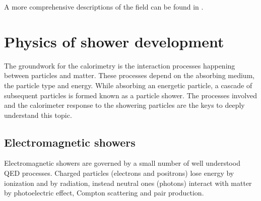 A more comprehensive descriptions of the field can be found in \cite{Wigmans_book, Wigmans_art_of_cal, Gianotti_article}.

\section{Physics of shower development}
The groundwork for the calorimetry is the interaction processes happening between particles and matter.
These processes depend on the absorbing medium, the particle type and energy.
While absorbing an energetic particle, a cascade of subsequent particles is formed known as a particle shower.
The processes involved and the calorimeter response to the showering particles are the keys to deeply understand this topic.\\

\subsection{Electromagnetic showers} \label{subsec:em_shower}
Electromagnetic showers are governed by a small number of well understood QED processes. Charged particles (electrons and positrons) lose energy by ionization and by radiation, instead neutral ones (photons) interact with matter by photoelectric effect, Compton scattering and pair production.\\

